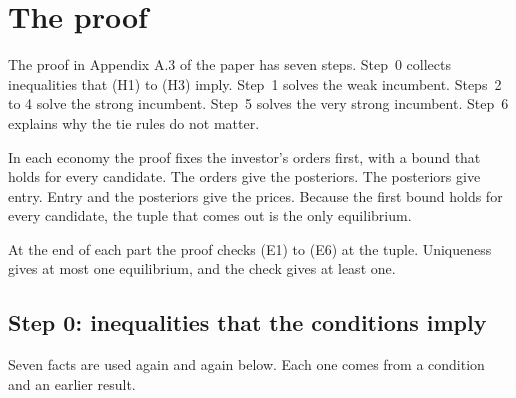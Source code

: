 \section{The proof}\label{sec:ccc-proof}

The proof in Appendix A.3 of the paper has seven steps. Step~0 collects inequalities that (H1) to (H3) imply. Step~1
solves the weak incumbent. Steps~2 to 4 solve the strong incumbent. Step~5 solves the very strong incumbent. Step~6
explains why the tie rules do not matter.

\begin{keyidea}
In each economy the proof fixes the investor's orders first, with a bound that holds for every candidate. The
orders give the posteriors. The posteriors give entry. Entry and the posteriors give the prices. Because the first
bound holds for every candidate, the tuple that comes out is the only equilibrium.
\end{keyidea}

At the end of each part the proof checks (E1) to (E6) at the tuple. Uniqueness gives at most one equilibrium, and
the check gives at least one.

\subsection{Step 0: inequalities that the conditions imply}\label{sec:ccc-proof-0}

Seven facts are used again and again below. Each one comes from a condition and an earlier result.

